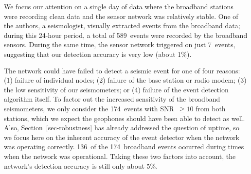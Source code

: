 We focus our attention on a single day of data where the
broadband stations were recording clean data and the sensor network
was relatively stable. One of the authors, a seismologist, visually 
extracted events from the broadband data; during this 24-hour period,
a total of 589~events were recorded by the broadband sensors. During
the same time, the sensor network triggered on just 7~events,
suggesting that our detection accuracy is very low (about 1\%).

The network could have failed to detect a seismic event for one
of four reasons: (1) failure of individual nodes; (2) failure of
the base station or radio modem; (3) the low sensitivity of our
seismometers; or (4) failure of the event detection
algorithm itself. To factor out the increased sensitivity of the 
broadband seismometers, we only consider the 174~events with SNR~$\geq 10$ 
from both stations, which we expect the geophones should 
have been able to detect as well. 
Also, Section~\ref{sec-robustness} has already addressed 
the question of uptime, so we focus here on the inherent accuracy 
of the event detector when the network was 
operating correctly. 136~of the 174~broadband events occurred during times
when the network was operational. Taking these two factors into
account, the network's detection accuracy is still only about 5\%. 



